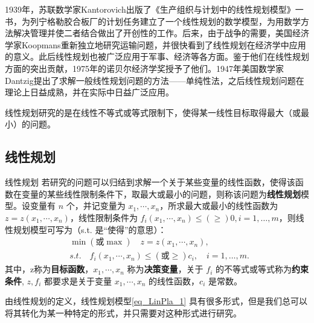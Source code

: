 
1939年，苏联数学家Kantorovich出版了《生产组织与计划中的线性规划模型》一书，为列宁格勒胶合板厂的计划任务建立了一个线性规划的数学模型，为用数学方法解决管理并使二者结合做出了开创性的工作。后来，由于战争的需要，美国经济学家Koopmans重新独立地研究运输问题，并很快看到了线性规划在经济学中应用的意义。此后线性规划也被广泛应用于军事、经济等各方面。鉴于他们在线性规划方面的突出贡献，1975年的诺贝尔经济学奖授予了他们。1947年美国数学家Dantzig提出了求解一般线性规划问题的方法——单纯性法，之后线性规划问题在理论上日益成熟，并在实际中日益广泛应用。

线性规划研究的是在线性不等式或等式限制下，使得某一线性目标取得最大（或最小）的问题。

\subsection{线性规划}

\begin{definition}{线性规划}
若研究的问题可以归结到求解一个关于某些变量的线性函数，使得该函数在变量的某些线性限制条件下，取最大或最小的问题，则称该问题为\textbf{线性规划}模型。设变量有 $n$ 个，并记变量为 $x_1,\cdots,x_n$，所求最大或最小的线性函数为 $z=z(x_1,\cdots,x_n)$，线性限制条件为 $f_i(x_1,\cdots,x_n)\leq(\geq) 0,i=1,\dots,m$，则线性规划模型可写为（s.t. 是“使得”的意思）：
\begin{equation}\label{eq_LinPla_1}
\begin{aligned}
&\min(\text{或}\max) \quad z=z(x_1,\cdots ,x_n),\\
&s.t.\quad f_i(x_1,\cdots,x_n)\leq(\text{或}\geq) c_i,\quad i=1,\dots,m.
\end{aligned}~
\end{equation}
其中，z称为\textbf{目标函数}，$x_1,\cdots,x_n$ 称为\textbf{决策变量}，关于 $f_i$ 的不等式或等式称为\textbf{约束条件}, $z,f_i$ 都要求是关于变量 $x_1,\cdots,x_n$ 的线性函数，$c_i$ 是常数。
\end{definition}

由线性规划的定义，线性规划模型\autoref{eq_LinPla_1} 具有很多形式，但是我们总可以将其转化为某一种特定的形式，并只需要对这种形式进行研究。

